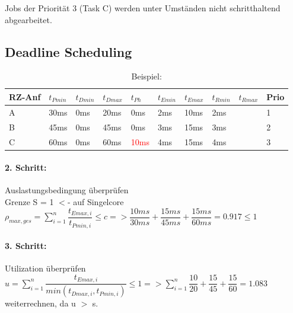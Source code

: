 \documentclass[12pt,a4paper,oneside,ngerman]{article}
\begin{document}
Jobs der Priorität 3 (Task C) werden unter Umständen nicht schritthaltend abgearbeitet.\\



\pagebreak
\subsection{Deadline Scheduling}
\begin{table}[H]
	\caption{Beispiel:}
	\begin{tabular}{|l|l|l|l|l|l|l|l|l|l|}
	\hline
	RZ-Anf & \(t_{Pmin}\) & \(t_{Dmin}\) & \(t_{Dmax}\) & \(t_{Ph}\) & \(t_{Emin}\) & \(t_{Emax}\) & \(t_{Rmin}\) & \(t_{Rmax}\) & Prio \\ \hline
	A      & 30ms         & 0ms          & 20ms         & 0ms        & 2ms          & 10ms         & 2ms          &              & 1    \\ \hline
	B      & 45ms         & 0ms          & 45ms         & 0ms        & 3ms          & 15ms         & 3ms          &              & 2    \\ \hline
	C      & 60ms         & 0ms          & 60ms         & \textcolor{red}{10ms}       & 4ms          & 15ms         & 4ms          &              & 3    \\ \hline
	\end{tabular}
\end{table}

\paragraph{2. Schritt:} Auslastungsbedingung überprüfen\\
Grenze S = 1 $<$- auf Singelcore\\
\(\rho_{max,ges} = \displaystyle\sum_{i=1}^n \dfrac{t_{Emax,i}}{t_{Pmin,i}} \leq c => \dfrac{10ms}{30ms} + \dfrac{15ms}{45ms} + \dfrac{15ms}{60ms} = 0.917 \leq 1\)\\

\paragraph{3. Schritt:} Utilization überprüfen\\
\(u = \displaystyle\sum_{i=1}^n \dfrac{t_{Emax,i}}{ min(t_{Dmax,i}, t_{Pmin,i})} \leq 1 => \displaystyle\sum_{i=1}^n \dfrac{10}{20} + \dfrac{15}{45} + \dfrac{15}{60} = 1.083\) \\

weiterrechnen, da u $>$ s.\\
\end{document}
